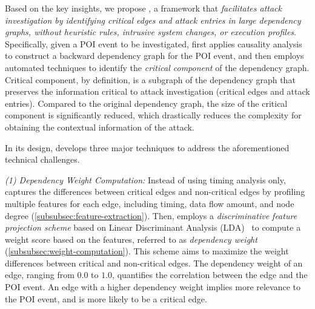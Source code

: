 Based on the key insights, we propose \tool, a framework that \emph{facilitates attack investigation by identifying critical edges and attack entries in large dependency graphs, without heuristic rules, intrusive system changes, or execution profiles}. 
Specifically, given a POI event to be investigated, 
\tool first applies causality analysis to construct a backward dependency graph for the POI event, and then employs automated techniques to identify the \emph{critical component} of the dependency graph.
Critical component, by definition, is a subgraph of the dependency graph that preserves the information critical to attack investigation (\ie critical edges and attack entries).
Compared to the original dependency graph, the size of the critical component is significantly reduced, which drastically reduces the complexity for obtaining the contextual information of the attack. 

In its design, \tool develops three major techniques to address the aforementioned technical challenges. 

\emph{(1) Dependency Weight Computation:}
Instead of using timing analysis only, \tool captures the differences between critical edges and non-critical edges by profiling multiple features for each edge, including timing, data flow amount, and node degree (\cref{subsubsec:feature-extraction}).
Then, \tool employs a \emph{discriminative feature projection scheme} based on Linear Discriminant Analysis (LDA)~\cite{Mika99fisherdiscriminant} to compute a weight score based on the features, referred to as \emph{dependency weight} (\cref{subsubsec:weight-computation}). 
This scheme aims to maximize the weight differences between critical and non-critical edges.
The dependency weight of an edge, ranging from $0.0$ to $1.0$, quantifies the correlation between the edge and the POI event. 
An edge with a higher dependency weight implies more relevance to the POI event, and is more likely to be a critical edge.


